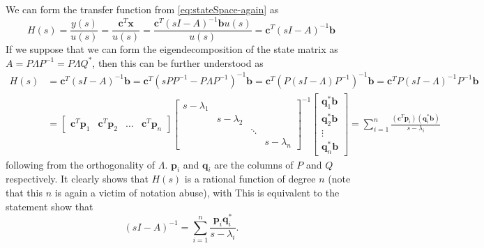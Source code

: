 \documentclass{article}
\begin{document}
	We can form the transfer function from \autoref{eq:stateSpace-again} as 
	\begin{equation}
		H(s) = \frac{y(s)}{u(s)} = \frac{\textbf{c}^T \textbf{x}}{u(s)} = \frac{\textbf{c}^T \left(s I - A\right)^{-1}\textbf{b} u(s) }{u(s)} = \textbf{c}^T \left(s I - A\right)^{-1}\textbf{b}
	\end{equation}
	If we suppose that we can form the eigendecomposition of the state matrix as $A = P \Lambda P^{-1} = P \Lambda Q^\ast$, then this can be further understood as 
	\begin{equation}\label{eq:transferFunction}
		\begin{aligned}
			H(s)&=\mathbf{c}^T(sI-A)^{-1}\mathbf{b} 
			= \mathbf{c}^T(sP P ^{-1}-P \Lambda P^{-1})^{-1}\mathbf{b}
			= \mathbf{c}^T\left(P \left(s I -\Lambda \right)P^{-1}\right)^{-1}\mathbf{b} 
			= \mathbf{c}^T P \left(s I -\Lambda \right)^{-1}P^{-1}\mathbf{b}  \\
			&
			= \begin{bmatrix}
				\textbf{c}^T \textbf{p}_1 & \textbf{c}^T \textbf{p}_2 & \dots & \textbf{c}^T \textbf{p}_n
			\end{bmatrix}
			\begin{bmatrix}
				s - \lambda_1 & & & \\
				& s - \lambda_2 & & \\
				&& \ddots & \\
				&&& s - \lambda_n
			\end{bmatrix}^{-1}
			\begin{bmatrix}
				\textbf{q}_1^\ast \textbf{b} \\ \textbf{q}_2^\ast \textbf{b} \\ \vdots \\ \textbf{q}_n^\ast \textbf{b}
			\end{bmatrix}
			=\sum_{i=1}^n \frac{(\mathbf{c}^T\mathbf{p}_i)(\mathbf{q}_i^{\ast}\mathbf{b})}{s-\lambda_i}
		\end{aligned} 
	\end{equation}
	following from the orthogonality of $\Lambda$. $\textbf{p}_i$ and $\textbf{q}_i$ are the columns of $P$ and $Q$ respectively.
	It clearly shows that $H(s)$ is a rational function of degree $n$ (note that this $n$ is again a victim of notation abuse), with 
	This is equivalent to the statement
	 show that
	\begin{equation}
		(sI-A)^{-1}=\sum_{i=1}^{n}\frac{\mathbf{p}_i\mathbf{q}_i^{\ast}}{s-\lambda_i}.
	\end{equation}
	
\end{document}
